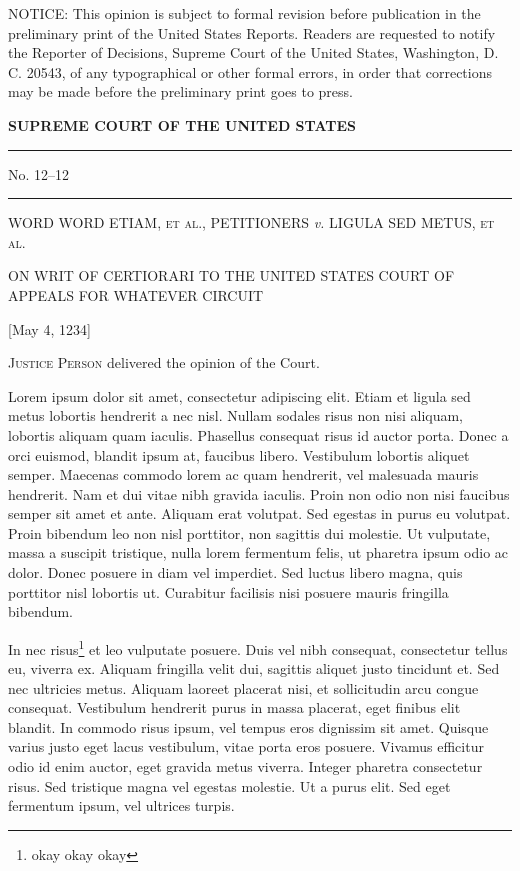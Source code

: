 \documentclass[11pt,twoside]{article}
\begin{document}
{\noindent \scriptsize NOTICE: This opinion is subject to formal
  revision before publication in the preliminary print of the United
  States Reports. Readers are requested to notify the Reporter of
  Decisions, Supreme Court of the United States, Washington, D. C.
  20543, of any typographical or other formal errors, in order that
  corrections may be made before the preliminary print goes to
  press.\par}

\begin{center}

  {\large \bfseries SUPREME COURT OF THE UNITED STATES}

  \rule{2cm}{.4pt}

  {\small No. 12--12}

  \rule{2cm}{.4pt}

  \textsc{WORD WORD ETIAM, et al., PETITIONERS} \emph{v.}
  \textsc{LIGULA SED METUS, et al.}

  \vspace{1ex}

  {\small ON WRIT OF CERTIORARI TO THE UNITED STATES COURT OF APPEALS
    FOR WHATEVER CIRCUIT}

  \vspace{1ex}

  {\small [May 4, 1234]}

\end{center}




\textsc{Justice Person} delivered the opinion of the Court.

Lorem ipsum dolor sit amet, consectetur adipiscing elit. Etiam et ligula sed metus lobortis hendrerit a nec nisl. Nullam sodales risus non nisi aliquam, lobortis aliquam quam iaculis. Phasellus consequat risus id auctor porta. Donec a orci euismod, blandit ipsum at, faucibus libero. Vestibulum lobortis aliquet semper. Maecenas commodo lorem ac quam hendrerit, vel malesuada mauris hendrerit. Nam et dui vitae nibh gravida iaculis. Proin non odio non nisi faucibus semper sit amet et ante. Aliquam erat volutpat. Sed egestas in purus eu volutpat. Proin bibendum leo non nisl porttitor, non sagittis dui molestie. Ut vulputate, massa a suscipit tristique, nulla lorem fermentum felis, ut pharetra ipsum odio ac dolor. Donec posuere in diam vel imperdiet. Sed luctus libero magna, quis porttitor nisl lobortis ut. Curabitur facilisis nisi posuere mauris fringilla bibendum.

In nec risus\footnote{okay okay okay}
et leo vulputate posuere. Duis vel nibh consequat, consectetur tellus eu, viverra ex. Aliquam fringilla velit dui, sagittis aliquet justo tincidunt et. Sed nec ultricies metus. Aliquam laoreet placerat nisi, et sollicitudin arcu congue consequat. Vestibulum hendrerit purus in massa placerat, eget finibus elit blandit. In commodo risus ipsum, vel tempus eros dignissim sit amet. Quisque varius justo eget lacus vestibulum, vitae porta eros posuere. Vivamus efficitur odio id enim auctor, eget gravida metus viverra. Integer pharetra consectetur risus. Sed tristique magna vel egestas molestie. Ut a purus elit. Sed eget fermentum ipsum, vel ultrices turpis.
\end{document}
